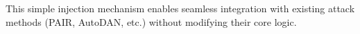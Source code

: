 \documentclass[letterpaper]{article}
\begin{document}
This simple injection mechanism enables seamless integration with existing attack methods (PAIR, AutoDAN, etc.) without modifying their core logic.



\end{document}
